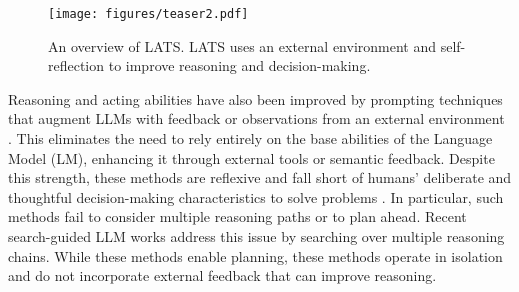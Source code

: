 \documentclass{article} \usepackage{iclr2024_conference,times}
\begin{document}
\begin{wrapfigure}{r}{0.5\textwidth}
  \centering
  \vspace{-0.2in}
  \texttt{[image: figures/teaser2.pdf]}
  \caption{An overview of LATS. LATS uses an external environment and self-reflection to improve	reasoning and decision-making.}
  \vspace{-0.2in}
  \label{fig:teaser}
\end{wrapfigure}

Reasoning and acting abilities have also been improved by prompting techniques that augment LLMs with feedback or observations from an external environment \citep{yao2023react, gao2022pal, shinn2023reflexion}. This eliminates the need to rely entirely on the base abilities of the Language Model (LM), enhancing it through external tools or semantic feedback. Despite this strength, these methods are reflexive and fall short of humans' deliberate and thoughtful decision-making characteristics to solve problems \citep{Sloman1996TheEC,evans2010intuition}. In particular, such methods fail to consider multiple reasoning paths or to plan ahead. Recent search-guided LLM works \citep{xie2023decomposition, yao2023tree, hao2023reasoning} address this issue by searching over multiple reasoning chains. While these methods enable planning, these methods operate in isolation and do not incorporate external feedback that can improve reasoning. 
\end{document}
